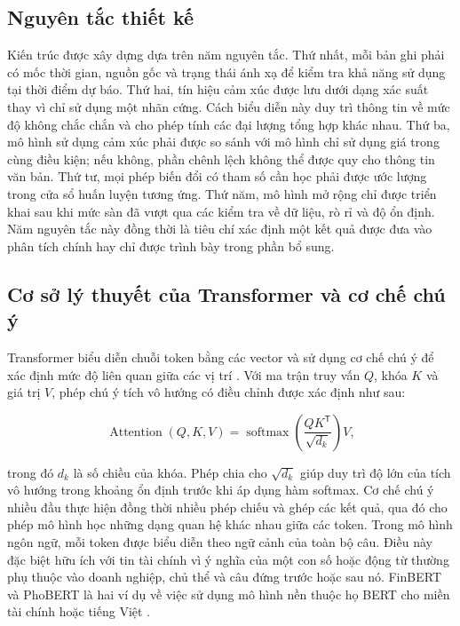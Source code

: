 \documentclass[12pt, a4paper, oneside]{report}
\begin{document}
\subsection{Nguyên tắc thiết kế}

Kiến trúc được xây dựng dựa trên năm nguyên tắc. Thứ nhất, mỗi bản ghi phải có mốc thời
gian, nguồn gốc và trạng thái ánh xạ để kiểm tra khả năng sử dụng tại thời điểm dự báo.
Thứ hai, tín hiệu cảm xúc được lưu dưới dạng xác suất thay vì chỉ sử dụng một nhãn
cứng. Cách biểu diễn này duy trì thông tin về mức độ không chắc chắn và cho phép tính
các đại lượng tổng hợp khác nhau. Thứ ba, mô hình sử dụng cảm xúc phải được so sánh với
mô hình chỉ sử dụng giá trong cùng điều kiện; nếu không, phần chênh lệch không thể được
quy cho thông tin văn bản. Thứ tư, mọi phép biến đổi có tham số cần học phải được ước
lượng trong cửa sổ huấn luyện tương ứng. Thứ năm, mô hình mở rộng chỉ được triển khai
sau khi mức sàn đã vượt qua các kiểm tra về dữ liệu, rò rỉ và độ ổn định. Năm nguyên
tắc này đồng thời là tiêu chí xác định một kết quả được đưa vào phân tích chính hay chỉ
được trình bày trong phần bổ sung.

\subsection{Cơ sở lý thuyết của Transformer và cơ chế chú ý}

Transformer biểu diễn chuỗi token bằng các vector và sử dụng cơ chế chú ý để xác định
mức độ liên quan giữa các vị trí \cite{Vaswani2017_attention}. Với ma trận truy vấn
$Q$, khóa $K$ và giá trị $V$, phép chú ý tích vô hướng có điều chỉnh được xác định như
sau:

\begin{equation}
  \operatorname{Attention}(Q,K,V)=
  \operatorname{softmax}\left(\frac{QK^{\mathsf{T}}}{\sqrt{d_k}}\right)V,
  \label{eq:scaled-attention}
\end{equation}

trong đó $d_k$ là số chiều của khóa. Phép chia cho $\sqrt{d_k}$ giúp duy trì độ lớn của
tích vô hướng trong khoảng ổn định trước khi áp dụng hàm softmax. Cơ chế chú ý nhiều
đầu thực hiện đồng thời nhiều phép chiếu và ghép các kết quả, qua đó cho phép mô hình
học những dạng quan hệ khác nhau giữa các token. Trong mô hình ngôn ngữ, mỗi token
được biểu diễn theo ngữ cảnh của toàn bộ câu. Điều này đặc biệt hữu ích với tin tài chính vì
ý nghĩa của một con số hoặc động từ thường phụ thuộc vào doanh nghiệp, chủ thể và câu đứng trước hoặc sau nó. FinBERT và PhoBERT là hai ví dụ về việc sử dụng mô hình
nền thuộc họ BERT cho miền tài chính hoặc tiếng Việt
\cite{Devlin2019_bert,Yang2020_200608097v2,
Nguyen2020_200300744v3}.
\end{document}
